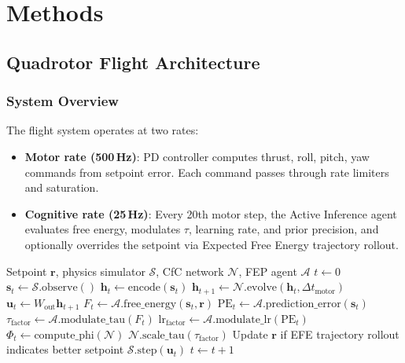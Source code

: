 \documentclass[11pt,a4paper]{article}
\begin{document}
\section{Methods}
\label{sec:methods}

\subsection{Quadrotor Flight Architecture}

\subsubsection{System Overview}

The flight system operates at two rates:
\begin{itemize}
  \item \textbf{Motor rate (500\,Hz)}: PD controller computes thrust, roll, pitch, yaw commands from setpoint error. Each command passes through rate limiters and saturation.
  \item \textbf{Cognitive rate (25\,Hz)}: Every 20th motor step, the Active Inference agent evaluates free energy, modulates $\tau$, learning rate, and prior precision, and optionally overrides the setpoint via Expected Free Energy trajectory rollout.
\end{itemize}

\begin{algorithm}
\caption{CDC Flight Control Loop}
\label{alg:flight}
\begin{algorithmic}[1]
\REQUIRE Setpoint $\mathbf{r}$, physics simulator $\mathcal{S}$, CfC network $\mathcal{N}$, FEP agent $\mathcal{A}$
\STATE $t \leftarrow 0$
  \STATE $\mathbf{s}_t \leftarrow \mathcal{S}.\text{observe}()$ 
  \STATE $\mathbf{h}_t \leftarrow \text{encode}(\mathbf{s}_t)$ 
  \STATE $\mathbf{h}_{t+1} \leftarrow \mathcal{N}.\text{evolve}(\mathbf{h}_t, \Delta t_{\text{motor}})$ 
  \STATE $\mathbf{u}_t \leftarrow W_{\text{out}} \mathbf{h}_{t+1}$ 
   
    \STATE $F_t \leftarrow \mathcal{A}.\text{free\_energy}(\mathbf{s}_t, \mathbf{r})$
    \STATE $\text{PE}_t \leftarrow \mathcal{A}.\text{prediction\_error}(\mathbf{s}_t)$
    \STATE $\tau_{\text{factor}} \leftarrow \mathcal{A}.\text{modulate\_tau}(F_t)$
    \STATE $\text{lr}_{\text{factor}} \leftarrow \mathcal{A}.\text{modulate\_lr}(\text{PE}_t)$
    \STATE $\Phi_t \leftarrow \text{compute\_phi}(\mathcal{N})$ 
    \STATE $\mathcal{N}.\text{scale\_tau}(\tau_{\text{factor}})$
    \STATE Update $\mathbf{r}$ if EFE trajectory rollout indicates better setpoint
  \ENDIF
  \STATE $\mathcal{S}.\text{step}(\mathbf{u}_t)$
  \STATE $t \leftarrow t + 1$
\ENDWHILE
\end{algorithmic}
\end{algorithm}
\end{document}
